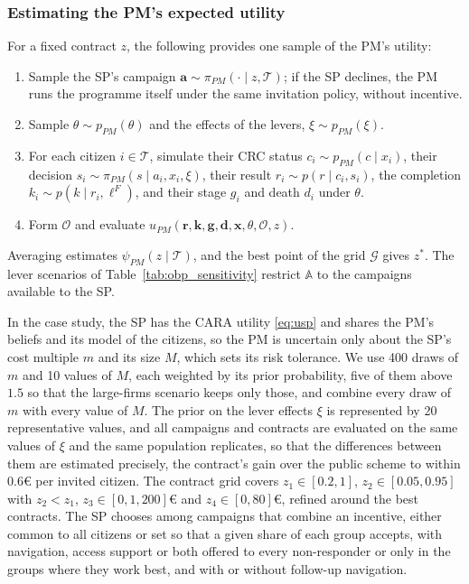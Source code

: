 \documentclass[12pt]{article}
\begin{document}
\subsubsection{Estimating the PM's expected utility}\label{app:simulation_OBP_utility}
For a fixed contract $z$, the following provides one sample of the PM's utility:
\begin{enumerate}
  \item Sample the SP's campaign $\mathbf{a} \sim \pi_{PM}(\cdot \mid z, \mathcal{T})$; if the SP declines, the PM runs the programme itself under the same invitation policy, without incentive.
  \item Sample $\theta \sim p_{PM}(\theta)$ and the effects of the levers, $\xi \sim p_{PM}(\xi)$.
  \item For each citizen $i \in \mathcal{T}$, simulate their CRC status $c_i \sim p_{PM}(c \mid x_i)$, their decision $s_i \sim \pi_{PM}(s \mid a_i, x_i, \xi)$, their result $r_i \sim p(r \mid c_i, s_i)$, the completion $k_i \sim p(k \mid r_i, \ell^F)$, and their stage $g_i$ and death $d_i$ under $\theta$.
  \item Form $\mathcal{O}$ and evaluate $u_{PM}(\mathbf{r}, \mathbf{k}, \mathbf{g}, \mathbf{d}, \mathbf{x}, \theta, \mathcal{O}, z)$.
\end{enumerate}
Averaging estimates $\psi_{PM}(z \mid \mathcal{T})$, and the best point of the grid $\mathcal{G}$ gives $z^*$. The lever scenarios of Table~\ref{tab:obp_sensitivity} restrict $\mathbb{A}$ to the campaigns available to the SP.

In the case study, the SP has the CARA utility \eqref{eq:usp} and shares the PM's beliefs and its model of the citizens, so the PM is uncertain only about the SP's cost multiple $m$ and its size $M$, which sets its risk tolerance. We use 400 draws of $m$ and 10 values of $M$, each weighted by its prior probability, five of them above $1.5$ so that the large-firms scenario keeps only those, and combine every draw of $m$ with every value of $M$. The prior on the lever effects $\xi$ is represented by 20 representative values, and all campaigns and contracts are evaluated on the same values of $\xi$ and the same population replicates, so that the differences between them are estimated precisely, the contract's gain over the public scheme to within 0.6€ per invited citizen. The contract grid covers $z_1 \in [0.2, 1]$, $z_2 \in [0.05, 0.95]$ with $z_2 < z_1$, $z_3 \in [0, 1{,}200]$€ and $z_4 \in [0, 80]$€, refined around the best contracts. The SP chooses among campaigns that combine an incentive, either common to all citizens or set so that a given share of each group accepts, with navigation, access support or both offered to every non-responder or only in the groups where they work best, and with or without follow-up navigation.
\end{document}
